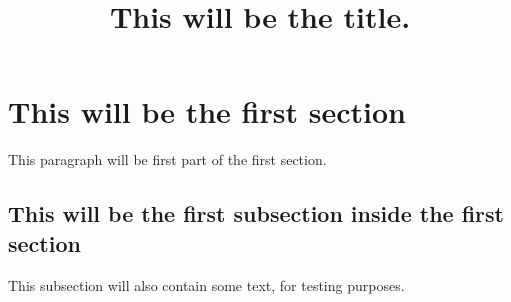 \documentclass[11pt]{article}
\title{This will be the title.}
\begin{document}
\maketitle
   
\section{This will be the first section}

This paragraph will be first part of the first section.

\subsection{This will be the first subsection inside the first section}

This subsection will also contain some text, for testing purposes.
\end{document}
